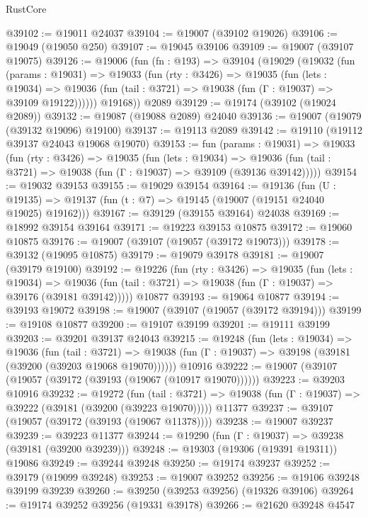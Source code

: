 \begin{lexlean}{RustCore}
\begin{coremodule}
@39102 := @19011 @24037
@39104 := @19007 (@39102 @19026)
@39106 := @19049 (@19050 @250)
@39107 := @19045 @39106
@39109 := @19007 (@39107 @19075)
@39126 := @19006
    (fun (fn : @193) =>
    @39104
      (@19029
        (@19032
          (fun (params : @19031) =>
          @19033
            (fun (rty : @3426) =>
            @19035
              (fun (lets : @19034) =>
              @19036 (fun (tail : @3721) => @19038 (fun (Γ : @19037) => @39109 @19122))))))
        @19168))
    @2089
@39129 := @19174 (@39102 (@19024 @2089))
@39132 := @19087 (@19088 @2089) @24040
@39136 := @19007 (@19079 (@39132 @19096) @19100)
@39137 := @19113 @2089
@39142 := @19110 (@19112 @39137 @24043 @19068 @19070)
@39153 := fun (params : @19031) =>
  @19033
    (fun (rty : @3426) =>
    @19035
      (fun (lets : @19034) =>
      @19036 (fun (tail : @3721) => @19038 (fun (Γ : @19037) => @39109 (@39136 @39142)))))
@39154 := @19032 @39153
@39155 := @19029 @39154
@39164 := @19136
    (fun (U : @19135) => @19137 (fun (t : @7) => @19145 (@19007 (@19151 @24040 @19025) @19162)))
@39167 := @39129 (@39155 @39164) @24038
@39169 := @18992 @39154 @39164
@39171 := @19223 @39153 @10875
@39172 := @19060 @10875
@39176 := @19007 (@39107 (@19057 (@39172 @19073)))
@39178 := @39132 (@19095 @10875)
@39179 := @19079 @39178
@39181 := @19007 (@39179 @19100)
@39192 := @19226
    (fun (rty : @3426) =>
    @19035
      (fun (lets : @19034) =>
      @19036 (fun (tail : @3721) => @19038 (fun (Γ : @19037) => @39176 (@39181 @39142)))))
    @10877
@39193 := @19064 @10877
@39194 := @39193 @19072
@39198 := @19007 (@39107 (@19057 (@39172 @39194)))
@39199 := @19108 @10877
@39200 := @19107 @39199
@39201 := @19111 @39199
@39203 := @39201 @39137 @24043
@39215 := @19248
    (fun (lets : @19034) =>
    @19036
      (fun (tail : @3721) =>
      @19038 (fun (Γ : @19037) => @39198 (@39181 (@39200 (@39203 @19068 @19070))))))
    @10916
@39222 := @19007 (@39107 (@19057 (@39172 (@39193 (@19067 (@10917 @19070))))))
@39223 := @39203 @10916
@39232 := @19272
    (fun (tail : @3721) => @19038 (fun (Γ : @19037) => @39222 (@39181 (@39200 (@39223 @19070)))))
    @11377
@39237 := @39107 (@19057 (@39172 (@39193 (@19067 @11378))))
@39238 := @19007 @39237
@39239 := @39223 @11377
@39244 := @19290 (fun (Γ : @19037) => @39238 (@39181 (@39200 @39239)))
@39248 := @19303 (@19306 (@19391 @19311)) @19086
@39249 := @39244 @39248
@39250 := @19174 @39237
@39252 := @39179 (@19099 @39248)
@39253 := @19007 @39252
@39256 := @19106 @39248 @39199 @39239
@39260 := @39250 (@39253 @39256) (@19326 @39106)
@39264 := @19174 @39252 @39256 (@19331 @39178)
@39266 := @21620 @39248 @4547

\end{coremodule}
\end{lexlean}
